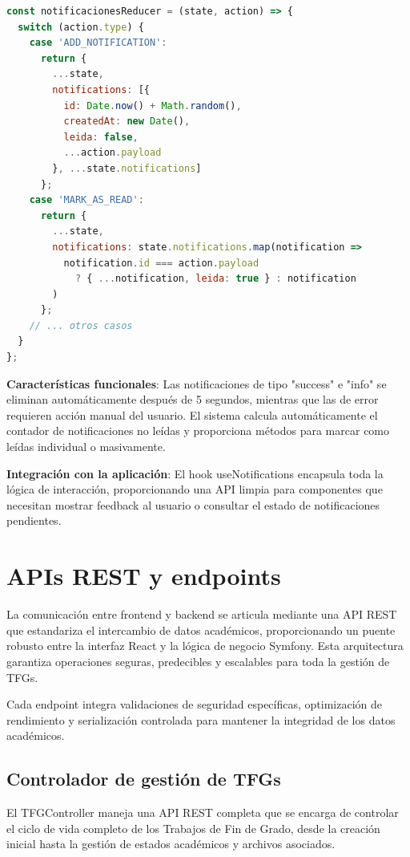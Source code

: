 \documentclass[12pt,a4paper,oneside]{report}
\begin{document}
\begin{lstlisting}[language=JavaScript]
const notificacionesReducer = (state, action) => {
  switch (action.type) {
    case 'ADD_NOTIFICATION':
      return {
        ...state,
        notifications: [{
          id: Date.now() + Math.random(),
          createdAt: new Date(),
          leida: false,
          ...action.payload
        }, ...state.notifications]
      };
    case 'MARK_AS_READ':
      return {
        ...state,
        notifications: state.notifications.map(notification =>
          notification.id === action.payload
            ? { ...notification, leida: true } : notification
        )
      };
    // ... otros casos
  }
};
\end{lstlisting}

\textbf{Características funcionales}: Las notificaciones de tipo "success" e "info" se eliminan automáticamente después de 5 segundos, mientras que las de error requieren acción manual del usuario. El sistema calcula automáticamente el contador de notificaciones no leídas y proporciona métodos para marcar como leídas individual o masivamente.

\textbf{Integración con la aplicación}: El hook useNotifications encapsula toda la lógica de interacción, proporcionando una API limpia para componentes que necesitan mostrar feedback al usuario o consultar el estado de notificaciones pendientes.

\section{APIs REST y endpoints}\label{apis-rest-y-endpoints}

La comunicación entre frontend y backend se articula mediante una API REST que estandariza el intercambio de datos académicos, proporcionando un puente robusto entre la interfaz React y la lógica de negocio Symfony. Esta arquitectura garantiza operaciones seguras, predecibles y escalables para toda la gestión de TFGs.

Cada endpoint integra validaciones de seguridad específicas, optimización de rendimiento y serialización controlada para mantener la integridad de los datos académicos.

\subsection{Controlador de gestión de TFGs}\label{tfg-controller-con-api-platform}

El TFGController maneja una API REST completa que se encarga de controlar el ciclo de vida completo de los Trabajos de Fin de Grado, desde la creación inicial hasta la gestión de estados académicos y archivos asociados.
\end{document}
